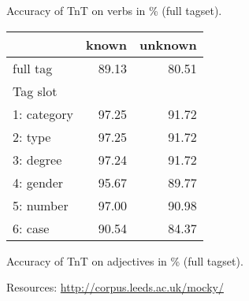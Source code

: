 \documentclass[largefonts]{sciposter}
\begin{document}
\begin{multicols}{2}
\begin{table}
\begin{center}
    Accuracy of TnT on verbs in \% (full tagset).

\vspace{2cm}

      \begin{tabular}{lrr}
        \hline
        & known & unknown \\
        \hline \hline
        full tag & 89.13 & 80.51 \\
        \hline \hline

        Tag slot & &\\
        \hline \hline

        1: category & 97.25 & 91.72 \\
        2: type & 97.25& 91.72 \\
        3: degree & 97.24 & 91.72  \\
        4: gender & 95.67 & 89.77  \\
        5: number & 97.00 & 90.98 \\
        6: case & 90.54 & 84.37 \\
        \hline
      \end{tabular}

      Accuracy of TnT on adjectives in \% (full tagset).
  \end{center}
\end{table}


Resources: \url{http://corpus.leeds.ac.uk/mocky/}

\end{multicols}
\end{document}
